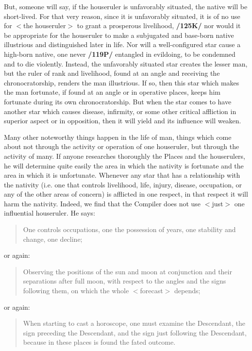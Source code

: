 But, someone will say, if the houseruler is unfavorably situated, the native will be short-lived. For that very reason, since it is unfavorably situated, it is of no use for $<$the houseruler$>$ to grant a prosperous livelihood, \textbf{/125K/} nor would it be appropriate for the houseruler to make a subjugated and base-born native illustrious and distinguished later in life. Nor will a well-configured star cause a high-born native, one never \textbf{/119P/} entangled in evildoing, to be condemned and to die violently. Instead, the unfavorably situated star creates the lesser man, but the ruler of rank and livelihood, found at an angle and receiving the chronocratorship, renders the man illustrious. If so, then this star which makes the man fortunate, if found at an angle or in operative places, keeps him fortunate during its own chronocratorship. But when the star comes to have another star which causes disease, infirmity, or some other critical affliction in superior aspect or in opposition, then it will yield and its influence will weaken. 

Many other noteworthy things happen in the life of man, things which come about not through the activity or operation of one houseruler, but through the activity of many. If anyone researches thoroughly the Places and the houserulers, he will determine quite easily the area in which the nativity is fortunate and the area in which it is unfortunate. Whenever any star that has a relationship with the nativity (i.e. one that controls livelihood, life, injury, disease, occupation, or any of the other areas of concern) is afflicted in one respect, in that respect it will harm the nativity. Indeed, we
find that the Compiler does not use $<$just$>$ one influential houseruler. He says: \begin{quote}One controls occupations, one the possession of years, one stability and change, one decline; \end{quote}
or again:
\begin{quote}Observing the positions of the sun and moon at conjunction and their separations after full moon, with
respect to the angles and the signs following them, on which the whole $<$forecast$>$ depends;\end{quote}
or again:
\begin{quote}When starting to cast a horoscope, one must examine the Descendant, the sign preceding the Descendant,
and the sign just following the Descendant, because in these places is found the fated outcome.\end{quote}

